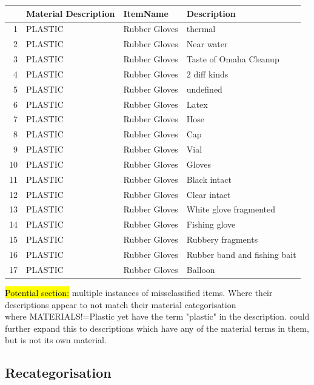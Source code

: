 \documentclass[10pt]{article}\usepackage[]{graphicx}\usepackage[]{color}
\begin{document}
\begin{table}[ht]
\centering
\begin{tabular}{rlll}
  \hline
 & Material Description & ItemName & Description \\ 
  \hline
1 & PLASTIC & Rubber Gloves & thermal \\ 
  2 & PLASTIC & Rubber Gloves & Near water \\ 
  3 & PLASTIC & Rubber Gloves & Taste of Omaha Cleanup \\ 
  4 & PLASTIC & Rubber Gloves & 2 diff kinds \\ 
  5 & PLASTIC & Rubber Gloves & undefined \\ 
  6 & PLASTIC & Rubber Gloves & Latex \\ 
  7 & PLASTIC & Rubber Gloves & Hose \\ 
  8 & PLASTIC & Rubber Gloves & Cap \\ 
  9 & PLASTIC & Rubber Gloves & Vial \\ 
  10 & PLASTIC & Rubber Gloves & Gloves \\ 
  11 & PLASTIC & Rubber Gloves & Black intact \\ 
  12 & PLASTIC & Rubber Gloves & Clear intact \\ 
  13 & PLASTIC & Rubber Gloves & White glove fragmented \\ 
  14 & PLASTIC & Rubber Gloves & Fishing glove \\ 
  15 & PLASTIC & Rubber Gloves & Rubbery fragments \\ 
  16 & PLASTIC & Rubber Gloves & Rubber band and fishing bait \\ 
  17 & PLASTIC & Rubber Gloves & Balloon \\ 
   \hline
\end{tabular}
\end{table}



\hl{Potential section:} multiple instances of missclassified items. Where their descriptions appear to not match their material categorisation\\
where MATERIALS!=Plastic yet have the term "plastic" in the description. could further expand this to descriptions which have any of the material terms in them, but is not its own material.


\pagebreak
\subsection{Recategorisation}
\end{document}
